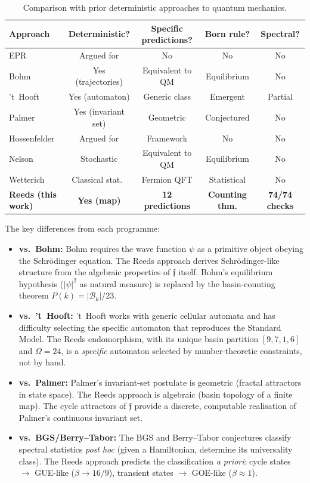 \documentclass[12pt,a4paper]{article}
\theoremstyle{definition}
\theoremstyle{remark}
\newcommand{\Reeds}{\mathfrak{f}}
\newcommand{\Basin}{\mathcal{B}}
\begin{document}
\begin{table}[H]
\centering
\caption{Comparison with prior deterministic approaches to quantum mechanics.}
\label{tab:comparison}
\begin{tabular}{lcccc}
\toprule
\textbf{Approach} & \textbf{Deterministic?} & \textbf{Specific predictions?} & \textbf{Born rule?} & \textbf{Spectral?} \\
\midrule
EPR \cite{epr1935} & Argued for & No & No & No \\
Bohm \cite{bohm1952} & Yes (trajectories) & Equivalent to QM & Equilibrium & No \\
't~Hooft \cite{thooft2016} & Yes (automaton) & Generic class & Emergent & Partial \\
Palmer \cite{palmer2020} & Yes (invariant set) & Geometric & Conjectured & No \\
Hossenfelder \cite{hossenfelder2020} & Argued for & Framework & No & No \\
Nelson \cite{nelson1966} & Stochastic & Equivalent to QM & Equilibrium & No \\
Wetterich \cite{wetterich2010} & Classical stat.\ & Fermion QFT & Statistical & No \\
\textbf{Reeds (this work)} & \textbf{Yes (map)} & \textbf{12 predictions} & \textbf{Counting thm.} & \textbf{74/74 checks} \\
\bottomrule
\end{tabular}
\end{table}

The key differences from each programme:
\begin{itemize}
  \item \textbf{vs.\ Bohm:} Bohm requires the wave function $\psi$ as a
  primitive object obeying the Schr\"odinger equation. The Reeds approach derives
  Schr\"odinger-like structure from the algebraic properties of $\Reeds$ itself.
  Bohm's equilibrium hypothesis ($|\psi|^2$ as natural measure) is replaced by
  the basin-counting theorem $P(k) = |\Basin_k|/23$.

  \item \textbf{vs.\ 't~Hooft:} 't~Hooft works with generic cellular automata
  and has difficulty selecting the specific automaton that reproduces the Standard
  Model. The Reeds endomorphism, with its unique basin partition $[9,7,1,6]$ and
  $\Omega = 24$, is a \emph{specific} automaton selected by number-theoretic
  constraints, not by hand.

  \item \textbf{vs.\ Palmer:} Palmer's invariant-set postulate is geometric
  (fractal attractors in state space). The Reeds approach is algebraic (basin
  topology of a finite map). The cycle attractors of $\Reeds$ provide a discrete,
  computable realisation of Palmer's continuous invariant set.

  \item \textbf{vs.\ BGS/Berry--Tabor:} The BGS and Berry--Tabor conjectures
  classify spectral statistics \emph{post hoc} (given a Hamiltonian, determine
  its universality class). The Reeds approach predicts the classification
  \emph{a priori}: cycle states $\to$ GUE-like ($\beta \to 16/9$), transient
  states $\to$ GOE-like ($\beta \approx 1$).
\end{itemize}
\end{document}
